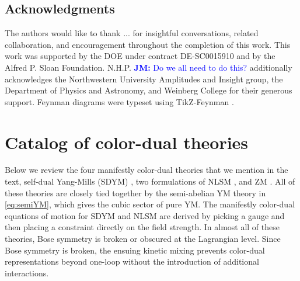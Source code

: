 \documentclass[11pt,letter]{article}
\newcommand{\jm}[1]{\textcolor{blue}{\textbf{JM: }{#1}}}
\begin{document}
\subsection*{Acknowledgments}
The authors would like to thank ... for insightful conversations,
related collaboration, and encouragement throughout the completion of
this work. This work was supported by the DOE under contract
DE-SC0015910 and by the Alfred P. Sloan
Foundation. N.H.P. \jm{Do we all need to do this?} additionally acknowledges the Northwestern
University Amplitudes and Insight group, the Department of Physics and
Astronomy, and Weinberg College for their generous support.  Feynman
diagrams were typeset using TikZ-Feynman \cite{Ellis:2016jkw}.

\appendix
\section{Catalog of color-dual theories}
\label{sec:CKLagrangians}

Below we review the four manifestly color-dual theories that we mention in
the text, self-dual Yang-Mills (SDYM) \cite{Monteiro2011pc}, two formulations of NLSM \cite{Cheung:2016prv,Cheung:2020djz,Cheung:2021zvb}, and ZM \cite{Zakharov:1973pp, Cheung:2022mix}.  All
of these theories are closely tied together by the semi-abelian YM
theory in \cref{eq:semiYM}, which gives the cubic sector of pure YM.
The manifestly color-dual equations of motion for SDYM and NLSM are
derived by picking a gauge and then placing a constraint directly on the
field strength. In almost all of these
theories, Bose symmetry is broken or obscured at the Lagrangian level.
Since Bose symmetry is broken, the ensuing kinetic mixing prevents color-dual representations beyond one-loop without the introduction of additional interactions.
\end{document}
